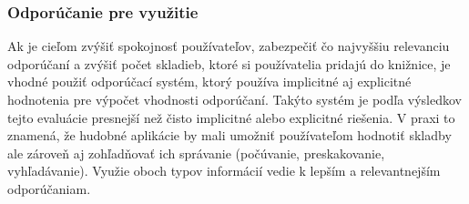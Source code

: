 \subsubsection{Odporúčanie pre využitie}
Ak je cieľom zvýšiť spokojnosť používateľov, zabezpečiť čo najvyššiu relevanciu odporúčaní a zvýšiť počet skladieb, ktoré si používatelia pridajú do knižnice, je vhodné použiť odporúčací systém, ktorý používa implicitné aj explicitné hodnotenia pre výpočet vhodnosti odporúčaní. Takýto systém je podľa výsledkov tejto evaluácie presnejší než čisto implicitné alebo explicitné riešenia. V praxi to znamená, že hudobné aplikácie by mali umožniť používateľom hodnotiť skladby ale zároveň aj zohľadňovať ich správanie (počúvanie, preskakovanie, vyhľadávanie). Využie oboch typov informácií vedie k lepším a relevantnejším odporúčaniam.


